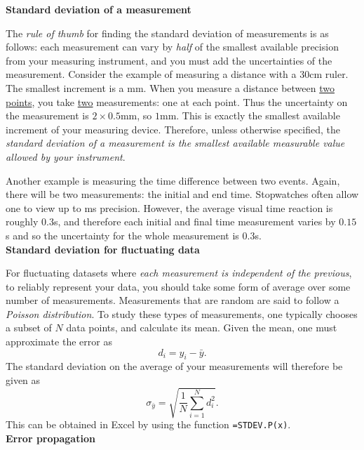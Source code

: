 \documentclass[12pt]{report}
\begin{document}
\noindent \large \textbf{Standard deviation of a measurement} \normalsize

The \textit{rule of thumb} for finding the standard deviation of measurements is as follows: each measurement can vary by \textit{half} of the smallest available precision from your measuring instrument, and you must add the uncertainties of the measurement. Consider the example of measuring a distance with a 30cm ruler. The smallest increment is a mm. When you measure a distance between \underline{two points}, you take \underline{two} measurements: one at each point. Thus the uncertainty on the measurement is $2 \times 0.5$mm, so $1$mm. This is exactly the smallest available increment of your measuring device. Therefore, unless otherwise specified, the \textit{standard deviation of a measurement is the smallest available measurable value allowed by your instrument}. 

Another example is measuring the time difference between two events. Again, there will be two measurements: the initial and end time. Stopwatches often allow one to view up to ms precision. However, the average visual time reaction is roughly $0.3$s, and therefore each initial and final time measurement varies by $0.15$s and so the uncertainty for the whole measurement is $0.3$s. \\

\noindent \textbf{Standard deviation for fluctuating data}

For fluctuating datasets where \textit{each measurement is independent of the previous}, to reliably represent your data, you should take some form of average over some number of measurements. Measurements that are random are said to follow a \textit{Poisson distribution}. To study these types of measurements, one typically chooses a subset of $N$ data points, and calculate its mean. Given the mean, one must approximate the error as
\begin{equation}
d_i = y_i - \bar{y}.
\end{equation}
The standard deviation on the average of your measurements will therefore be given as
\begin{equation}
\sigma_{\bar{y}} = \sqrt{ \frac{1}{N} \displaystyle \sum_{i=1}^{N} d_i^2}.
\label{Eq:STDev.P}
\end{equation}
This can be obtained in Excel by using the function \verb|=STDEV.P(x)|. \\

\noindent \large \textbf{Error propagation} \normalsize
\end{document}
